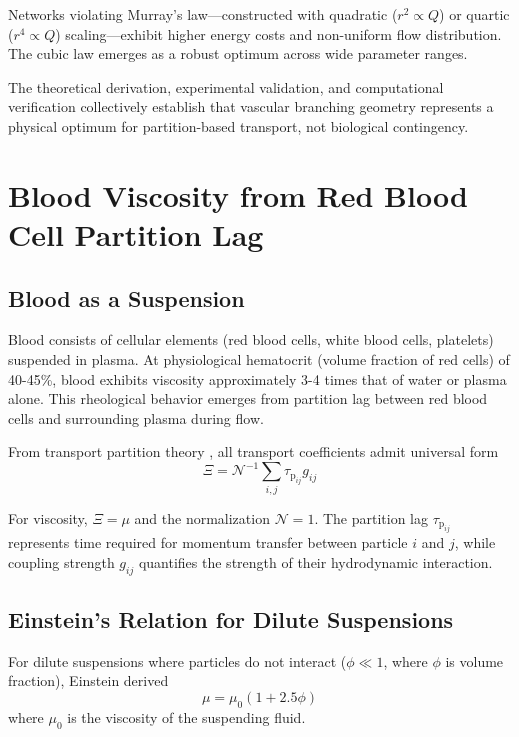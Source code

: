 \documentclass[10pt,twocolumn,a4paper]{article}
\theoremstyle{remark}
\newcommand{\taulag}{\tau_{\mathrm{p}}}
\begin{document}
Networks violating Murray's law—constructed with quadratic ($r^{2} \propto Q$) or quartic ($r^{4} \propto Q$) scaling—exhibit higher energy costs and non-uniform flow distribution. The cubic law emerges as a robust optimum across wide parameter ranges.

The theoretical derivation, experimental validation, and computational verification collectively establish that vascular branching geometry represents a physical optimum for partition-based transport, not biological contingency.

\section{Blood Viscosity from Red Blood Cell Partition Lag}
\label{sec:viscosity}

\subsection{Blood as a Suspension}

Blood consists of cellular elements (red blood cells, white blood cells, platelets) suspended in plasma. At physiological hematocrit (volume fraction of red cells) of 40-45\%, blood exhibits viscosity approximately 3-4 times that of water or plasma alone. This rheological behavior emerges from partition lag between red blood cells and surrounding plasma during flow.

From transport partition theory \cite{sachikonye2024transport}, all transport coefficients admit universal form
\begin{equation}
\Xi = \mathcal{N}^{-1} \sum_{i,j} \taulag_{ij} g_{ij}
\end{equation}

For viscosity, $\Xi = \mu$ and the normalization $\mathcal{N} = 1$. The partition lag $\taulag_{ij}$ represents time required for momentum transfer between particle $i$ and $j$, while coupling strength $g_{ij}$ quantifies the strength of their hydrodynamic interaction.

\subsection{Einstein's Relation for Dilute Suspensions}

For dilute suspensions where particles do not interact ($\phi \ll 1$, where $\phi$ is volume fraction), Einstein derived \cite{einstein1906new}
\begin{equation}
\mu = \mu_{0}(1 + 2.5\phi)
\label{eq:einstein}
\end{equation}
where $\mu_{0}$ is the viscosity of the suspending fluid.
\end{document}
